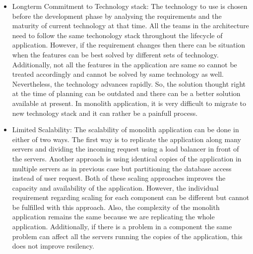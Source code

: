 \begin{itemize}[leftmargin=.5in]
\\
\item Longterm Commitment to Technology stack: The technology to use is chosen before the development phase by analysing the requirements and the maturity of current technology at that time. All the teams in the architecture need to follow the same techonology stack throughout the lifecycle of application. However, if the requirement changes then there can be situation when the features can be best solved by different sets of technology. Additionally, not all the features in the application are same so cannot be treated accordingly and cannot be solved by same technology as well. Nevertheless, the technology advances rapidly. So, the solution thought right at the time of planning can be outdated and there can be a better solution available at present. In monolith application, it is very difficult to migrate to new technology stack and it can rather be a painfull process.
\\
\item Limited Scalability: The scalability of monolith application can be done in either of two ways. The first way is to replicate the application along many servers and dividing the incoming request using a load balancer in front of the servers. Another approach is using identical copies of the application in multiple servers as in previous case but partitioning the database access instead of user request. Both of these scaling approaches improves the capacity and availability of the application. However, the individual requirement regarding scaling for each component can be different but cannot be fulfilled with this approach. Also, the complexity of the monolith application remains the same because we are replicating the whole application. Additionally, if there is a problem in a component the same problem can affect all the servers running the copies of the application, this does not improve resilency.\cite{MacVittie:2014aa}\cite{Namiot:2014aa}
\end{itemize}
\\

